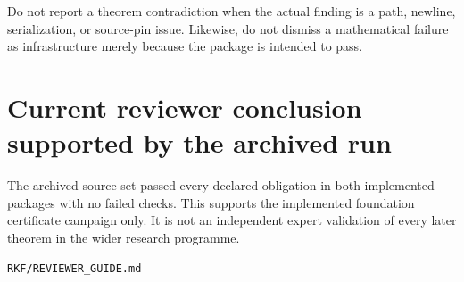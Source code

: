 Do not report a theorem contradiction when the actual finding is a path, newline, serialization, or source-pin issue. Likewise, do not dismiss a mathematical failure as infrastructure merely because the package is intended to pass.

\hypertarget{current-reviewer-conclusion-supported-by-the-archived-run}{%
\section{Current reviewer conclusion supported by the archived run}\label{current-reviewer-conclusion-supported-by-the-archived-run}}

The archived source set passed every declared obligation in both implemented packages with no failed checks. This supports the implemented foundation certificate campaign only. It is not an independent expert validation of every later theorem in the wider research programme.

\begin{flushright}\small\texttt{RKF/REVIEWER\_GUIDE.md}\end{flushright}
